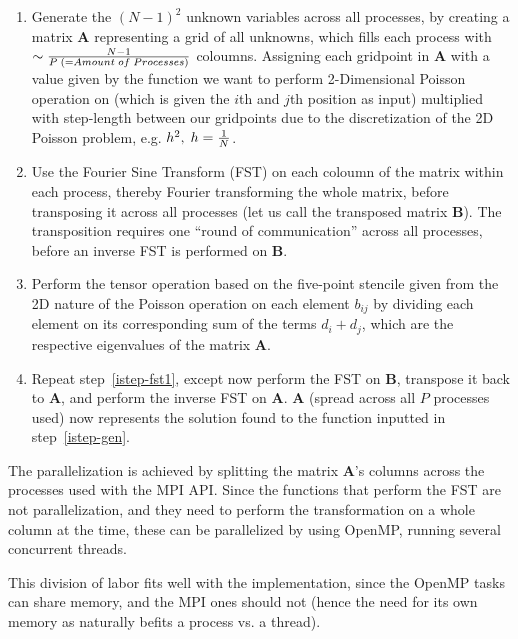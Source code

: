 \documentclass[fontsize=11pt,paper=a4,titlepage]{article}
\begin{document}
\begin{enumerate}

	\item \label{istep-gen} Generate the $(N - 1)^2$ unknown variables across
	all processes, by creating a matrix $\mathbf{A}$ representing a grid of all
	unknowns, which fills each process with $\sim \frac{N-1}{P \thickspace (=
	Amount 	\thickspace of\thickspace Processes)}$ coloumns. Assigning each
	gridpoint in $\mathbf{A}$ with a value given by the function we want to perform 2-Dimensional Poisson operation on (which is given the $i$th and
	$j$th position as input) multiplied with step-length between our gridpoints
	due to the discretization of the 2D Poisson problem, e.g. $h^2, \thickspace
	h = \frac{1}{N}$.

	\item \label{istep-fst1} Use the Fourier Sine Transform (FST) on each
	coloumn of the matrix within each process, thereby Fourier transforming the
	whole matrix, before transposing it across all processes (let us call the
	transposed matrix $\mathbf{B}$). The transposition requires one ``round
	of communication'' across all processes, before an inverse FST is performed
	on $\mathbf{B}$.

	\item \label{istep-tens} Perform the tensor operation based on the
	five-point stencile given from the 2D nature of the Poisson operation on
	each element $b_{ij}$ by dividing each element on its corresponding sum of
	the terms $d_i + d_j$, which are the respective eigenvalues of the matrix $
	\mathbf{A}$.

	\item \label{istep-fst2} Repeat step~\ref{istep-fst1}, except now perform
	the FST on $\mathbf{B}$, transpose it back to $\mathbf{A}$, and perform the
	inverse FST on $\mathbf{A}$. $\mathbf{A}$ (spread across all $P$ processes
	used) now represents the solution found to the function inputted in
	step~\ref{istep-gen}.

\end{enumerate}

The parallelization is achieved by splitting the matrix $\mathbf{A}$'s columns
across the processes used with the MPI API. Since the functions that perform the
FST are not parallelization, and they need to perform the transformation on a
whole column at the time, these can be parallelized by using OpenMP, running
several concurrent threads.

This division of labor fits well with the implementation, since the OpenMP tasks
can share memory, and the MPI ones should not (hence the need for its own memory
as naturally befits a process vs. a thread).
\end{document}
